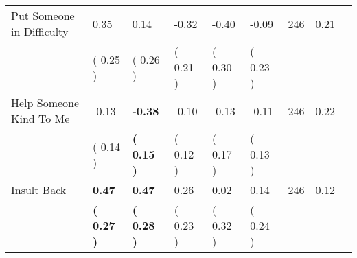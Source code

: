 \begin{tabular}{L{6.2cm} C{1.8cm} C{1.8cm} C{1.8cm} C{1.8cm} C{1.8cm} C{1.8cm} C{0.3cm} C{0.3cm}}
Put Someone in Difficulty &      0.35 &      0.14 &     -0.32 &     -0.40 &     -0.09  & 246 &       0.21 \\ 
 & (     0.25 ) & (     0.26 ) & (     0.21 ) & (     0.30 ) & (     0.23 )  & \\
Help Someone Kind To Me &     -0.13 & \textbf{    -0.38} &     -0.10 &     -0.13 &     -0.11  & 246 &       0.22 \\ 
 & (     0.14 ) & \textbf{(     0.15 )} & (     0.12 ) & (     0.17 ) & (     0.13 )  & \\
Insult Back & \textbf{     0.47} & \textbf{     0.47} &      0.26 &      0.02 &      0.14  & 246 &       0.12 \\ 
 & \textbf{(     0.27 )} & \textbf{(     0.28 )} & (     0.23 ) & (     0.32 ) & (     0.24 )  & \\
\bottomrule
\end{tabular}
